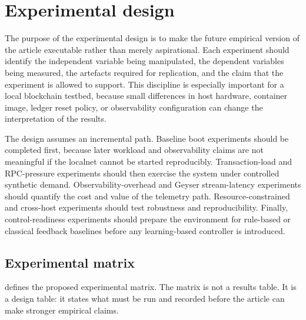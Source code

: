 \documentclass[11pt,a4paper]{article}
\begin{document}
\section{Experimental design}
\label{sec:experimental-design}

The purpose of the experimental design is to make the future empirical version of the article executable rather than merely aspirational. Each experiment should identify the independent variable being manipulated, the dependent variables being measured, the artefacts required for replication, and the claim that the experiment is allowed to support. This discipline is especially important for a local blockchain testbed, because small differences in host hardware, container image, ledger reset policy, or observability configuration can change the interpretation of the results.

The design assumes an incremental path. Baseline boot experiments should be completed first, because later workload and observability claims are not meaningful if the localnet cannot be started reproducibly. Transaction-load and RPC-pressure experiments should then exercise the system under controlled synthetic demand. Observability-overhead and Geyser stream-latency experiments should quantify the cost and value of the telemetry path. Resource-constrained and cross-host experiments should test robustness and reproducibility. Finally, control-readiness experiments should prepare the environment for rule-based or classical feedback baselines before any learning-based controller is introduced.

\subsection{Experimental matrix}
\label{subsec:experimental-matrix}

 defines the proposed experimental matrix. The matrix is not a results table. It is a design table: it states what must be run and recorded before the article can make stronger empirical claims.
\end{document}
